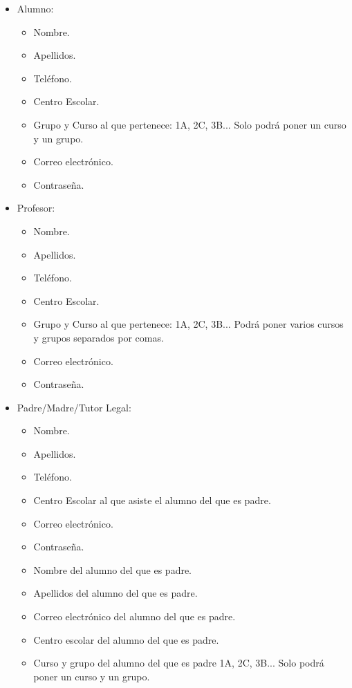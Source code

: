 		\begin{itemize}
			\item Alumno:
				\begin{itemize}
					\item Nombre.
					\item Apellidos.
					\item Teléfono.
					\item Centro Escolar.
					\item Grupo y Curso al que pertenece: 1A, 2C, 3B... Solo podrá poner un curso y un grupo.
					\item Correo electrónico.
					\item Contraseña.
				\end{itemize}
			\item Profesor:
				\begin{itemize}
					\item Nombre.
					\item Apellidos.
					\item Teléfono.
					\item Centro Escolar.
					\item Grupo y Curso al que pertenece: 1A, 2C, 3B... Podrá poner varios cursos y grupos separados por comas.
					\item Correo electrónico.
					\item Contraseña.
				\end{itemize}
			\item Padre/Madre/Tutor Legal:
				\begin{itemize}
					\item Nombre.
					\item Apellidos.
					\item Teléfono.
					\item Centro Escolar al que asiste el alumno del que es padre.
					\item Correo electrónico.
					\item Contraseña.
					\item Nombre del alumno del que es padre.
					\item Apellidos del alumno del que es padre.
					\item Correo electrónico del alumno del que es padre.
					\item Centro escolar del alumno del que es padre.
					\item Curso y grupo del alumno del que es padre 1A, 2C, 3B... Solo podrá poner un curso y un grupo.
				\end{itemize}
		\end{itemize}
		
